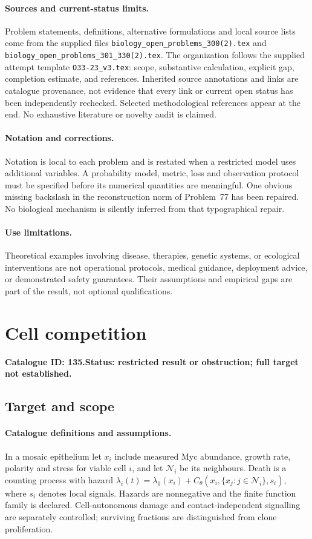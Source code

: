 \documentclass[11pt]{article}
\begin{document}
\paragraph{Sources and current-status limits.}
Problem statements, definitions, alternative formulations and local source lists
come from the supplied files
\texttt{biology\_open\_problems\_300(2).tex} and
\texttt{biology\_open\_problems\_301\_330(2).tex}.
The organization follows the supplied attempt template
\texttt{O33-23\_v3.tex}: scope, substantive calculation, explicit gap,
completion estimate, and references. Inherited source annotations and links are
catalogue provenance, not evidence that every link or current open status has
been independently rechecked. Selected methodological references appear at the
end. No exhaustive literature or novelty audit is claimed.

\paragraph{Notation and corrections.}
Notation is local to each problem and is restated when a restricted model uses
additional variables. A probability model, metric, loss and observation protocol
must be specified before its numerical quantities are meaningful. One obvious
missing backslash in the reconstruction norm of Problem~77 has been repaired.
No biological mechanism is silently inferred from that typographical repair.

\paragraph{Use limitations.}
Theoretical examples involving disease, therapies, genetic systems, or ecological
interventions are not operational protocols, medical guidance, deployment advice,
or demonstrated safety guarantees. Their assumptions and empirical gaps are part
of the result, not optional qualifications.

\setcounter{section}{134}
\section{Cell competition}
\label{prob:135}
\noindent\textbf{Catalogue ID: 135.}\quad \textbf{Status: restricted result or obstruction; full target not established.}
\subsection{Target and scope}
\paragraph{Catalogue definitions and assumptions.}
In a mosaic epithelium let $x_i$ include measured Myc abundance, growth rate, polarity and stress for viable cell $i$, and let $\mathcal N_i$ be its neighbours. Death is a counting process with hazard $\lambda_i(t)=\lambda_0(x_i)+C_\theta(x_i,\{x_j:j\in\mathcal N_i\},s_i)$, where $s_i$ denotes local signals. Hazards are nonnegative and the finite function family is declared. Cell-autonomous damage and contact-independent signalling are separately controlled; surviving fractions are distinguished from clone proliferation.
\end{document}

